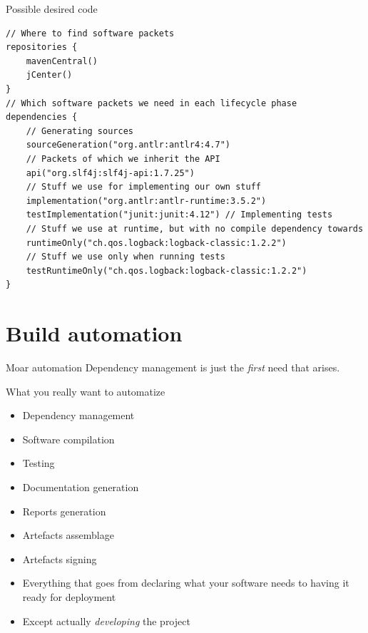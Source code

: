 \documentclass[presentation]{beamer}
\begin{document}
\begin{frame}[fragile]{Possible desired code}
  \begin{block}{}
    \begin{verbatim}
// Where to find software packets
repositories {
    mavenCentral()
    jCenter()
}
// Which software packets we need in each lifecycle phase
dependencies {
    // Generating sources
    sourceGeneration("org.antlr:antlr4:4.7")
    // Packets of which we inherit the API
    api("org.slf4j:slf4j-api:1.7.25")
    // Stuff we use for implementing our own stuff
    implementation("org.antlr:antlr-runtime:3.5.2")
    testImplementation("junit:junit:4.12") // Implementing tests
    // Stuff we use at runtime, but with no compile dependency towards
    runtimeOnly("ch.qos.logback:logback-classic:1.2.2")
    // Stuff we use only when running tests
    testRuntimeOnly("ch.qos.logback:logback-classic:1.2.2")
}
    \end{verbatim}
  \end{block}
\end{frame}

\section{Build automation}

\begin{frame}[fragile]{Moar automation}
	Dependency management is just the \textit{first} need that arises.
	
	\begin{block}{What you really want to automatize}
		\begin{itemize}
			\item Dependency management
			\item Software compilation
			\item Testing
			\item Documentation generation
			\item Reports generation
			\item Artefacts assemblage
			\item Artefacts signing
		\end{itemize}
	\end{block}
	\begin{itemize}
		\item Everything that goes from declaring what your software needs to having it ready for deployment
		\item Except actually \textit{developing} the project
	\end{itemize}
\end{frame}
\end{document}
